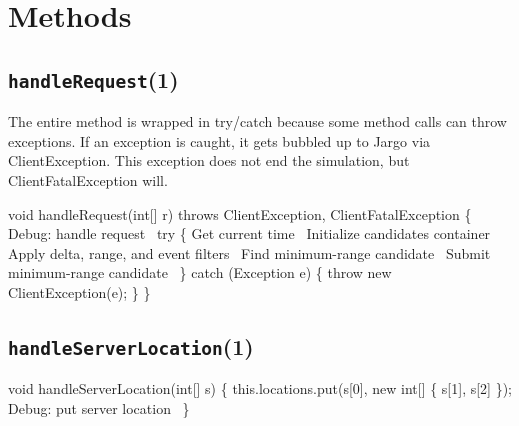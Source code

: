 \section{Methods}
\label{client-nearest: methods}

\subsection{\texttt{handleRequest}(1)}

The entire method is wrapped in try/catch because some method calls can throw
exceptions. If an exception is caught, it gets bubbled up to Jargo via
{\Tt{}ClientException\nwendquote}. This exception does not end the simulation, but
{\Tt{}ClientFatalException\nwendquote} will.

\nwenddocs{}\endmoddef\nwstartdeflinemarkup{}\nwenddeflinemarkup
void handleRequest(int[] r) throws ClientException, ClientFatalException \{
  \LA{}Debug: handle request~{\nwtagstyle{}}\RA{}
  try \{
    \LA{}Get current time~{\nwtagstyle{}}\RA{}
    \LA{}Initialize candidates container~{\nwtagstyle{}}\RA{}
    \LA{}Apply delta, range, and event filters~{\nwtagstyle{}}\RA{}
    \LA{}Find minimum-range candidate~{\nwtagstyle{}}\RA{}
    \LA{}Submit minimum-range candidate~{\nwtagstyle{}}\RA{}
  \} catch (Exception e) \{
    throw new ClientException(e);
  \}
\}
\nwendcode{}\nwdocspar

\subsection{\texttt{handleServerLocation}(1)}

\nwenddocs{}\endmoddef\nwstartdeflinemarkup{}\nwenddeflinemarkup
void handleServerLocation(int[] s) \{
  this.locations.put(s[0], new int[] \{ s[1], s[2] \});
  \LA{}Debug: put server location~{\nwtagstyle{}}\RA{}
\}
\nwendcode{}\nwdocspar

